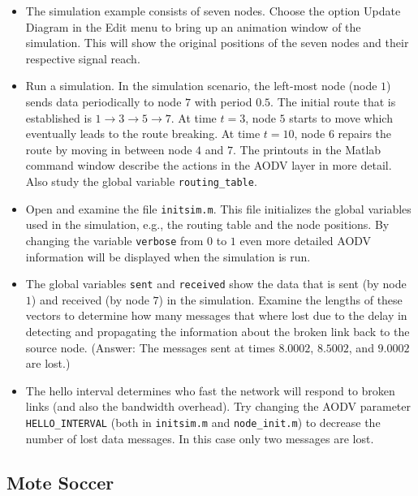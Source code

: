 \documentclass[final,twoside]{rapport}
\begin{document}
\begin{itemize}
\item The simulation example consists of seven nodes. Choose the option
  Update Diagram in the Edit menu to bring up an animation window of
  the simulation. This will show the original positions of the seven
  nodes and their respective signal reach.

\item Run a simulation. In the simulation scenario, the left-most node
  (node $1$) sends data periodically to node $7$ with period $0.5$.
  The initial route that is established is $1 \rightarrow 3
  \rightarrow 5 \rightarrow 7$. At time $t=3$, node $5$ starts to move
  which eventually leads to the route breaking. At time $t=10$, node
  $6$ repairs the route by moving in between node $4$ and $7$. The
  printouts in the Matlab command window describe the actions in the
  AODV layer in more detail. Also study the global variable
  \texttt{routing\_table}. 

\item Open and examine the file \texttt{initsim.m}. This file
  initializes the global variables used in the simulation, e.g., the
  routing table and the node positions. By changing the variable
  \texttt{verbose} from $0$ to $1$ even more detailed AODV
  information will be displayed when the simulation is run.

\item The global variables \texttt{sent} and \texttt{received} show
  the data that is sent (by node $1$) and received (by node $7$) in
  the simulation. Examine the lengths of these vectors to determine
  how many messages that where lost due to the delay in detecting and
  propagating the information about the broken link back to the source
  node. (Answer: The messages sent at times $8.0002$, $8.5002$, and
  $9.0002$ are lost.)

\item The hello interval determines who fast the network will respond
  to broken links (and also the bandwidth overhead). Try changing the
  AODV parameter \texttt{HELLO\_INTERVAL} (both in \texttt{initsim.m}
  and \texttt{node\_init.m}) to decrease the number of lost data
  messages. In this case only two messages are lost.

\end{itemize}

\subsection{Mote Soccer}
\end{document}
